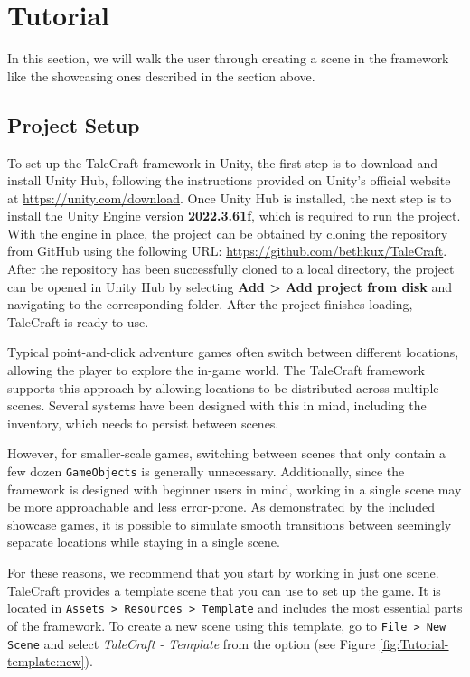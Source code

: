 \section{Tutorial}
In this section, we will walk the user through creating a scene in the framework like the showcasing ones described in the section above. 

\subsection{Project Setup}
To set up the TaleCraft framework in Unity, the first step is to download and install Unity Hub, following the instructions provided on Unity’s official website at \href{https://unity.com/download}{https://unity.com/download}. Once Unity Hub is installed, the next step is to install the Unity Engine version \textbf{2022.3.61f}, which is required to run the project. With the engine in place, the project can be obtained by cloning the repository from GitHub using the following URL: \href{https://github.com/bethkux/TaleCraft}{https://github.com/bethkux/TaleCraft}. After the repository has been successfully cloned to a local directory, the project can be opened in Unity Hub by selecting \textbf{Add > Add project from disk} and navigating to the corresponding folder. After the project finishes loading, TaleCraft is ready to use.

Typical point-and-click adventure games often switch between different locations, allowing the player to explore the in-game world. The TaleCraft framework supports this approach by allowing locations to be distributed across multiple scenes. Several systems have been designed with this in mind, including the inventory, which needs to persist between scenes. 

However, for smaller-scale games, switching between scenes that only contain a few dozen \texttt{GameObjects} is generally unnecessary. Additionally, since the framework is designed with beginner users in mind, working in a single scene may be more approachable and less error-prone. As demonstrated by the included showcase games, it is possible to simulate smooth transitions between seemingly separate locations while staying in a single scene.

For these reasons, we recommend that you start by working in just one scene. TaleCraft provides a template scene that you can use to set up the game. It is located in \texttt{Assets > Resources > Template} and includes the most essential parts of the framework. To create a new scene using this template, go to \texttt{File > New Scene} and select \textit{TaleCraft - Template} from the option (see Figure \ref{fig:Tutorial-template:new}). 

